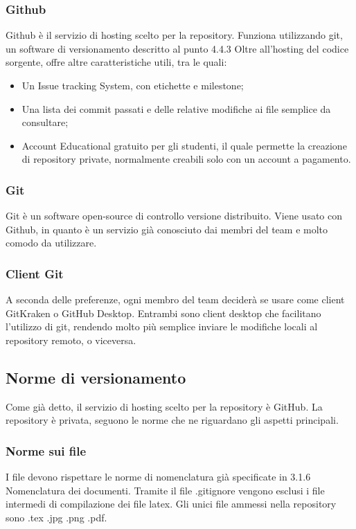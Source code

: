 \subsubsection{Github}
Github è il servizio di hosting scelto per la repository. Funziona utilizzando git, un software di versionamento descritto al punto 4.4.3 Oltre all'hosting del codice sorgente, offre altre caratteristiche utili, tra le quali:
\begin{itemize}  
\item Un Issue tracking System, con etichette e milestone;
\item Una lista dei commit passati e delle relative modifiche ai file semplice da consultare;
\item Account Educational gratuito per gli studenti, il quale permette la creazione di repository private, normalmente creabili solo con un account a pagamento.
\end{itemize}

\subsubsection{Git}
Git è un software open-source di controllo versione distribuito. 
Viene usato con Github, in quanto è un servizio già conosciuto dai membri del team e molto comodo da utilizzare.

\subsubsection{Client Git}
A seconda delle preferenze, ogni membro del team deciderà se usare come client GitKraken o GitHub Desktop. Entrambi sono client desktop che facilitano l'utilizzo di git, rendendo molto più semplice inviare le modifiche locali al repository remoto, o viceversa.

\subsection{Norme di versionamento}
Come già detto, il servizio di hosting scelto per la repository è GitHub.
La repository è privata, seguono le norme che ne riguardano gli aspetti principali.

\subsubsection{Norme sui file}
I file devono rispettare le norme di nomenclatura già specificate in 3.1.6 Nomenclatura dei documenti.
Tramite il file .gitignore vengono esclusi i file intermedi di compilazione dei file latex.
Gli unici file ammessi nella repository sono .tex .jpg .png .pdf.

